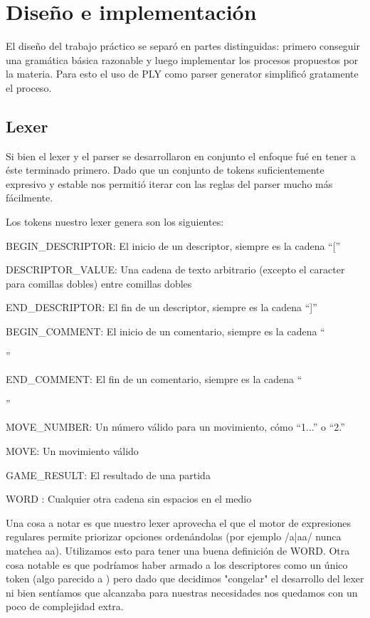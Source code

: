 \section{Diseño e implementación}

El diseño del trabajo práctico se separó en partes distinguidas: primero conseguir una gramática básica razonable y luego implementar los procesos propuestos por la materia. Para esto el uso de PLY como parser generator simplificó gratamente el proceso.

\subsection{Lexer}

Si bien el lexer y el parser se desarrollaron en conjunto el enfoque fué en tener a éste terminado primero. Dado que un conjunto de tokens suficientemente expresivo y estable nos permitió iterar con las reglas del parser mucho más fácilmente.

Los tokens nuestro lexer genera son los siguientes:
\begin{itemize}
    \item BEGIN\_DESCRIPTOR: El inicio de un descriptor, siempre es la cadena ``[''
    \item DESCRIPTOR\_VALUE: Una cadena de texto arbitrario (excepto el caracter para comillas dobles) entre comillas dobles
    \item END\_DESCRIPTOR: El fin de un descriptor, siempre es la cadena ``]''
    \item BEGIN\_COMMENT: El inicio de un comentario, siempre es la cadena ``{''
    \item END\_COMMENT: El fin de un comentario, siempre es la cadena ``}''
    \item MOVE\_NUMBER: Un número válido para un movimiento, cómo ``1...'' o ``2.''
    \item MOVE: Un movimiento válido
    \item GAME\_RESULT: El resultado de una partida
    \item WORD : Cualquier otra cadena sin espacios en el medio
\end{itemize}
    
    
Una cosa a notar es que nuestro lexer aprovecha el que el motor de expresiones regulares permite priorizar opciones ordenándolas (por ejemplo /a|aa/ nunca matchea aa). Utilizamos esto para tener una buena definición de WORD. Otra cosa notable es que podríamos haber armado a los descriptores como un único token (algo parecido a )  pero dado que decidimos "congelar" el desarrollo del lexer ni bien sentíamos que alcanzaba para nuestras necesidades nos quedamos con un poco de complejidad extra.

